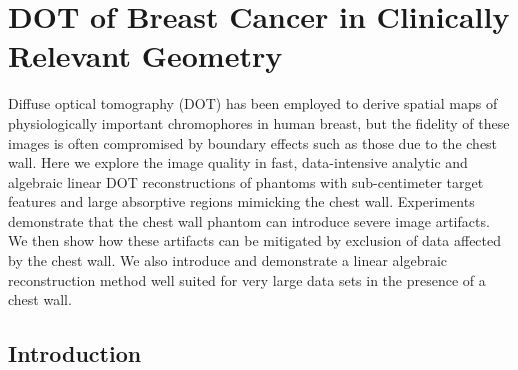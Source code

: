 \chapter{DOT of Breast Cancer in Clinically Relevant Geometry}

Diffuse optical tomography (DOT) has been employed to derive spatial maps of physiologically important chromophores in human breast, but the fidelity of these images is often compromised by boundary effects such as those due to the chest wall.  Here we explore the image quality in fast, data-intensive analytic and algebraic linear DOT reconstructions of phantoms with sub-centimeter target features and large absorptive regions mimicking the chest wall. Experiments demonstrate that the chest wall phantom can introduce severe image artifacts.  We then show how these artifacts can be mitigated by exclusion of data affected by the chest wall. We also introduce and demonstrate a linear algebraic reconstruction method well suited for very large data sets in the presence of a chest wall.

\section{Introduction}

